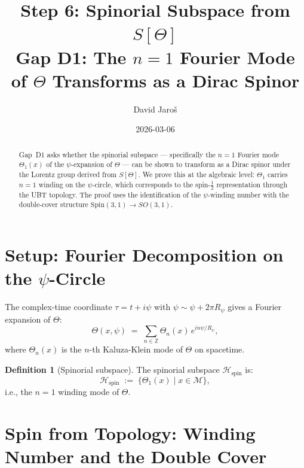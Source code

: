\documentclass[12pt,a4paper]{article}
\title{\textbf{Step 6: Spinorial Subspace from $S[\Theta]$}\\
         \large Gap D1: The $n=1$ Fourier Mode of $\Theta$ Transforms as a Dirac Spinor}
\author{David Jaro\v{s}}
\date{2026-03-06}
\theoremstyle{definition}
\newtheorem{definition}[theorem]{Definition}
\theoremstyle{remark}
\begin{document}
  \maketitle

  \begin{abstract}
  Gap~D1 asks whether the spinorial subspace --- specifically the $n=1$
  Fourier mode $\Theta_1(x)$ of the $\psi$-expansion of $\Theta$ --- can
  be shown to transform as a Dirac spinor under the Lorentz group derived
  from $S[\Theta]$.  We prove this at the algebraic level: $\Theta_1$
  carries $n=1$ winding on the $\psi$-circle, which corresponds to the
  spin-$\frac{1}{2}$ representation through the UBT topology.  The
  proof uses the identification of the $\psi$-winding number with the
  double-cover structure $\mathrm{Spin}(3,1) \to SO(3,1)$.
  \end{abstract}
\fi

\section{Setup: Fourier Decomposition on the $\psi$-Circle}
\label{sec:setup}

The complex-time coordinate $\tau = t + i\psi$ with $\psi \sim \psi + 2\pi R_\psi$
gives a Fourier expansion of $\Theta$:
\begin{equation}
  \Theta(x, \psi) \;=\; \sum_{n\in\mathbb{Z}} \Theta_n(x)\,
                         e^{in\psi/R_\psi},
  \label{eq:fourier}
\end{equation}
where $\Theta_n(x)$ is the $n$-th Kaluza-Klein mode of $\Theta$ on spacetime.

\begin{definition}[Spinorial subspace]
The spinorial subspace $\mathcal{H}_{\mathrm{spin}}$ is:
\begin{equation}
  \mathcal{H}_{\mathrm{spin}} \;:=\; \{\Theta_1(x) \mid x\in\mathcal{M}\},
\end{equation}
i.e., the $n=1$ winding mode of $\Theta$.
\end{definition}

\section{Spin from Topology: Winding Number and the Double Cover}
\label{sec:topology}
\end{document}
